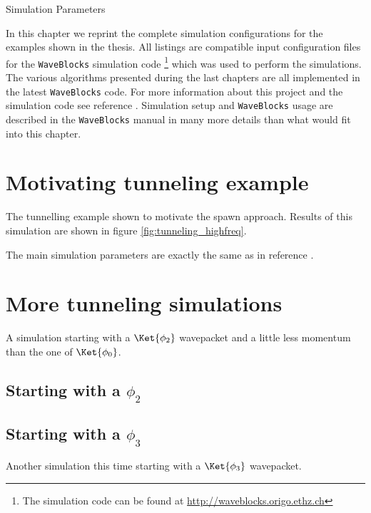 \begin{chapter}{Simulation Parameters}
\label{ch:simulation_parameters}

In this chapter we reprint the complete simulation configurations for the examples
shown in the thesis. All listings are compatible input configuration files for the
\texttt{WaveBlocks} simulation code \footnote{The simulation code can be found
at \url{http://waveblocks.origo.ethz.ch}} which was used to perform the simulations.
The various algorithms presented during the last chapters are all implemented
in the latest \texttt{WaveBlocks} code. For more information about this project
and the simulation code see reference \cite{waveblocks}. Simulation setup and
\texttt{WaveBlocks} usage are described in the \texttt{WaveBlocks} manual in
many more details than what would fit into this chapter.


\section{Motivating tunneling example}
\label{cfg:tunneling_phi0}

The tunnelling example shown to motivate the spawn approach. Results of this
simulation are shown in figure \ref{fig:tunneling_highfreq}.


The main simulation parameters are exactly the same as in reference \cite{GHJ_tunneling_spawning}.


\FloatBarrier
\section{More tunneling simulations}

A simulation starting with a $\Ket{\phi_2}$ wavepacket and a little less momentum
than the one of $\Ket{\phi_0}$.

\subsection{Starting with a $\phi_2$}
\label{cfg:tunneling_phi2}

\subsection{Starting with a $\phi_3$}
\label{cfg:tunneling_phi3}
Another simulation this time starting with a $\Ket{\phi_3}$ wavepacket.



\end{chapter}
